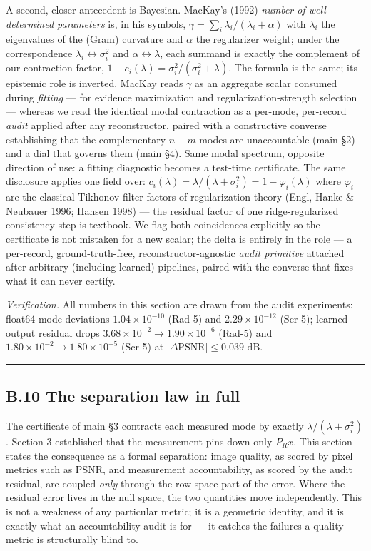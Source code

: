 \documentclass[11pt]{article}
\begin{document}
A second, closer antecedent is Bayesian. MacKay's (1992) \textit{number of well-determined parameters} is, in his symbols, $\gamma = \sum_i \lambda_i/(\lambda_i + \alpha)$ with $\lambda_i$ the eigenvalues of the (Gram) curvature and $\alpha$ the regularizer weight; under the correspondence $\lambda_i \leftrightarrow \sigma_i^2$ and $\alpha \leftrightarrow \lambda$, each summand is exactly the complement of our contraction factor, $1 - c_i(\lambda) = \sigma_i^2/(\sigma_i^2+\lambda)$. The formula is the same; its epistemic role is inverted. MacKay reads $\gamma$ as an aggregate scalar consumed during \textit{fitting} --- for evidence maximization and regularization-strength selection --- whereas we read the identical modal contraction as a per-mode, per-record \textit{audit} applied after any reconstructor, paired with a constructive converse establishing that the complementary $n - m$ modes are unaccountable (main §2) and a dial that governs them (main §4). Same modal spectrum, opposite direction of use: a fitting diagnostic becomes a test-time certificate. The same disclosure applies one field over: $c_i(\lambda) = \lambda/(\lambda+\sigma_i^2) = 1 - \varphi_i(\lambda)$ where $\varphi_i$ are the classical Tikhonov filter factors of regularization theory (Engl, Hanke \& Neubauer 1996; Hansen 1998) --- the residual factor of one ridge-regularized consistency step is textbook. We flag both coincidences explicitly so the certificate is not mistaken for a new scalar; the delta is entirely in the role --- a per-record, ground-truth-free, reconstructor-agnostic \textit{audit primitive} attached after arbitrary (including learned) pipelines, paired with the converse that fixes what it can never certify.

\textit{Verification.} All numbers in this section are drawn from the audit experiments: float64 mode deviations $1.04\times10^{-10}$ (Rad-5) and $2.29\times10^{-12}$ (Scr-5); learned-output residual drops $3.68\times10^{-2}\!\to\!1.90\times10^{-6}$ (Rad-5) and $1.80\times10^{-2}\!\to\!1.80\times10^{-5}$ (Scr-5) at $|\Delta\mathrm{PSNR}| \le 0.039$ dB.

\medskip\hrule\medskip

\subsection*{B.10 The separation law in full}


The certificate of main §3 contracts each measured mode by exactly $\lambda/(\lambda+\sigma_i^2)$. Section 3 established that the measurement pins down only $P_R x$. This section states the consequence as a formal separation: image quality, as scored by pixel metrics such as PSNR, and measurement accountability, as scored by the audit residual, are coupled \textit{only} through the row-space part of the error. Where the residual error lives in the null space, the two quantities move independently. This is not a weakness of any particular metric; it is a geometric identity, and it is exactly what an accountability audit is for --- it catches the failures a quality metric is structurally blind to.
\end{document}
